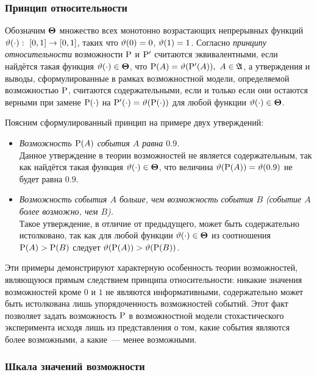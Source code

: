 \subsubsection{Принцип относительности}
\label{sec:sec_20151029_02}

Обозначим $\bTheta$ множество всех монотонно возрастающих непрерывных функций $\vtheta(\cdot):\ [0,1]\to[0,1]$, таких что $\vtheta(0) = 0$, $\vtheta(1) = 1$.
Согласно \emph{принципу относительности} возможности $\P$ и $\P'$ считаются эквивалентными, если найдётся такая функция $\vtheta(\cdot)\in\bTheta$, что $\P(A) = \vtheta(\P'(A)),\ A\in\Alg$, а утверждения и выводы, сформулированные в рамках возможностной модели, определяемой возможностью $\P$, считаются содержательными, если и только если они остаются верными при замене $\P(\cdot)$ на $\P'(\cdot) = \vtheta(\P(\cdot))$ для любой функции $\vtheta(\cdot)\in\bTheta$.

Поясним сформулированный принцип на примере двух утверждений:
\begin{itemize}
\item
    \emph{Возможность $\P(A)$ события $A$ равна $0.9$.}\\
    Данное утверждение в теории возможностей не является содержательным, так как найдётся такая функция $\vtheta(\cdot)\in\bTheta$, что величина $\vtheta(\P(A))=\vtheta(0.9)$ не будет равна $0.9$.

\item
    \emph{Возможность события $A$ больше, чем возможность события $B$ (событие $A$ более возможно, чем $B$).}\\
    Такое утверждение, в отличие от предыдущего, может быть содержательно истолковано, так как для любой функции $\vtheta(\cdot)\in\bTheta$ из соотношения $\P(A)>\P(B)$ следует $\vtheta(\P(A))>\vtheta(\P(B))$.
\end{itemize}

Эти примеры демонстрируют характерную особенность теории возможностей, являющуюся прямым следствием принципа относительности: никакие значения возможностей кроме $0$ и $1$ не являются информативными, содержательно может быть истолкована лишь упорядоченность возможностей событий. Этот факт позволяет задать возможность $\P$ в возможностной модели стохастического эксперимента исходя лишь из представления о том, какие события являются более возможными, а какие~--- менее возможными.

\subsubsection{Шкала значений возможности}
\label{sec:sec_20151029_03}

